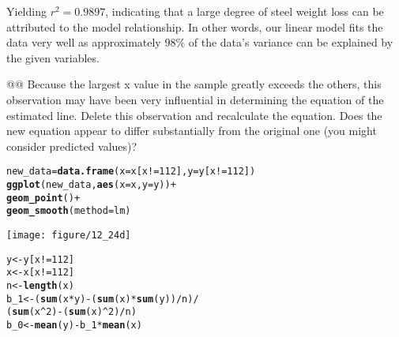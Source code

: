 \documentclass[10pt]{article}\usepackage[]{graphicx}\usepackage[]{xcolor}
\makeatletter
\def\maxwidth{ %
  \ifdim\Gin@nat@width>\linewidth
    \linewidth
  \else
    \Gin@nat@width
  \fi
}
\newcommand{\hlnum}[1]{\textcolor[rgb]{0.686,0.059,0.569}{#1}}%
\newcommand{\hlopt}[1]{\textcolor[rgb]{0,0,0}{#1}}%
\newcommand{\hlstd}[1]{\textcolor[rgb]{0.345,0.345,0.345}{#1}}%
\newcommand{\hlkwb}[1]{\textcolor[rgb]{0.69,0.353,0.396}{#1}}%
\newcommand{\hlkwc}[1]{\textcolor[rgb]{0.333,0.667,0.333}{#1}}%
\newcommand{\hlkwd}[1]{\textcolor[rgb]{0.737,0.353,0.396}{\textbf{#1}}}%
\newenvironment{kframe}{%
 \def\at@end@of@kframe{}%
 \ifinner\ifhmode%
  \def\at@end@of@kframe{\end{minipage}}%
  \begin{minipage}{\columnwidth}%
 \fi\fi%
 \def\FrameCommand##1{\hskip\@totalleftmargin \hskip-\fboxsep
 \colorbox{shadecolor}{##1}\hskip-\fboxsep
     \hskip-\linewidth \hskip-\@totalleftmargin \hskip\columnwidth}%
 \MakeFramed {\advance\hsize-\width
   \@totalleftmargin\z@ \linewidth\hsize
   \@setminipage}}%
 {\par\unskip\endMakeFramed%
 \at@end@of@kframe}
\newenvironment{knitrout}{}{} %
\makeatother
\begin{document}
\begin{easylist}[enumerate]
    Yielding $r^2 = 0.9897$, indicating that a large degree of steel weight loss can be attributed to the model
    relationship. In other words, our linear model fits the data very well as approximately $98\%$ of the data's
    variance can be explained by the given variables.

    @@ Because the largest x value in the sample greatly exceeds the others, this observation may have been very
    influential in determining the equation of the estimated line. Delete this observation and recalculate the equation.
    Does the new equation appear to differ substantially from the original one (you might consider predicted values)?

\begin{knitrout}
\color{fgcolor}\begin{kframe}
\begin{alltt}
         \hlstd{new_data} \hlkwb{=} \hlkwd{data.frame}\hlstd{(}\hlkwc{x}\hlstd{=x[x} \hlopt{!=} \hlnum{112}\hlstd{],} \hlkwc{y}\hlstd{=y[x} \hlopt{!=} \hlnum{112}\hlstd{])}
         \hlkwd{ggplot}\hlstd{(new_data,} \hlkwd{aes}\hlstd{(}\hlkwc{x}\hlstd{=x,} \hlkwc{y}\hlstd{=y))} \hlopt{+}
             \hlkwd{geom_point}\hlstd{()} \hlopt{+}
             \hlkwd{geom_smooth}\hlstd{(}\hlkwc{method}\hlstd{=lm)}
\end{alltt}
\end{kframe}

{\centering \texttt{[image: figure/12\_24d]} 

}


\begin{kframe}\begin{alltt}
         \hlstd{y} \hlkwb{<-} \hlstd{y[x} \hlopt{!=} \hlnum{112}\hlstd{]}
         \hlstd{x} \hlkwb{<-} \hlstd{x[x} \hlopt{!=} \hlnum{112}\hlstd{]}
         \hlstd{n} \hlkwb{<-} \hlkwd{length}\hlstd{(x)}
         \hlstd{b_1} \hlkwb{<-} \hlstd{(}\hlkwd{sum}\hlstd{(x} \hlopt{*} \hlstd{y)} \hlopt{-} \hlstd{(}\hlkwd{sum}\hlstd{(x)} \hlopt{*} \hlkwd{sum}\hlstd{(y))}\hlopt{/}\hlstd{n)} \hlopt{/}
                 \hlstd{(}\hlkwd{sum}\hlstd{(x}\hlopt{^}\hlnum{2}\hlstd{)} \hlopt{-} \hlstd{(}\hlkwd{sum}\hlstd{(x)}\hlopt{^}\hlnum{2}\hlstd{)}\hlopt{/}\hlstd{n)}
         \hlstd{b_0} \hlkwb{<-} \hlkwd{mean}\hlstd{(y)} \hlopt{-} \hlstd{b_1} \hlopt{*} \hlkwd{mean}\hlstd{(x)}
\end{alltt}
\end{kframe}
\end{knitrout}



\end{easylist}
\end{document}

